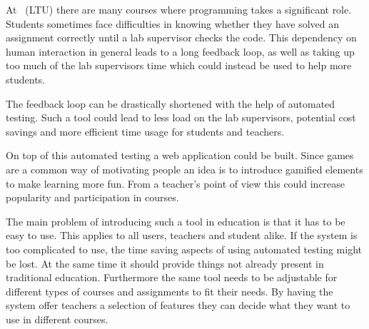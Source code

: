 At \LTU\ (LTU) there are many courses where programming takes a significant role. Students sometimes face difficulties in knowing whether they have solved an assignment correctly until a lab supervisor checks the code. This dependency on human interaction in general leads to a long feedback loop, as well as taking up too much of the lab supervisors time which could instead be used to help more students. 

The feedback loop can be drastically shortened with the help of automated testing. Such a tool could lead to less load on the lab supervisors, potential cost savings and more efficient time usage for students and teachers.

On top of this automated testing a web application could be built. Since games are a common way of motivating people an idea is to introduce gamified elements to make learning more fun. From a teacher's point of view this could increase popularity and participation in courses.

The main problem of introducing such a tool in education is that it has to be easy to use. This applies to all users, teachers and student alike. If the system is too complicated to use, the time saving aspects of using automated testing might be lost. At the same time it should provide things not already present in traditional education. Furthermore the same tool needs to be adjustable for different types of courses and assignments to fit their needs. By having the system offer teachers a selection of features they can decide what they want to use in different courses.
